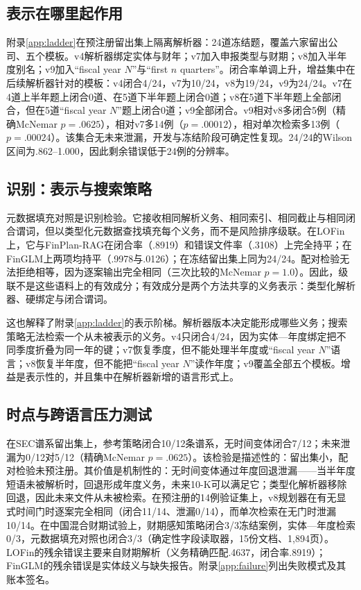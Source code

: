 \documentclass[10.5pt,a4paper]{ctexart}
\newcommand{\finplan}{FinPlan\mbox{-}RAG}
\begin{document}
\subsection{表示在哪里起作用}
附录\ref{app:ladder}在预注册留出集上隔离解析器：24道冻结题，覆盖六家留出公司、五个模板。v4解析器绑定实体与财年；v7加入申报类型与财期；v8加入半年度别名；v9加入“fiscal year $N$”与“first $n$ quarters”。闭合率单调上升，增益集中在后续解析器针对的模板：v4闭合4/24，v7为10/24，v8为19/24，v9为24/24。v7在4道上半年题上闭合0道、在5道下半年题上闭合0道；v8在5道下半年题上全部闭合，但在5道“fiscal year $N$”题上闭合0道；v9全部闭合。v9相对v8多闭合5例（精确McNemar $p=.0625$），相对v7多14例（$p=.00012$），相对单次检索多13例（$p=.00024$）。该集合无未来泄漏，开发与冻结阶段可确定性复现。24/24的Wilson区间为.862--1.000，因此剩余错误低于24例的分辨率。

\subsection{识别：表示与搜索策略}
\label{sec:identification}
元数据填充对照是识别检验。它接收相同解析义务、相同索引、相同截止与相同闭合谓词，但以类型化元数据查找填充每个义务，而不是风险排序级联。在LOFin上，它与\finplan{}在闭合率（.8919）和错误文件率（.3108）上完全持平；在FinGLM上两项均持平（.9978与.0126）；在冻结留出集上同为24/24。配对检验无法拒绝相等，因为逐案输出完全相同（三次比较的McNemar $p=1.0$）。因此，级联不是这些语料上的有效成分；有效成分是两个方法共享的义务表示：类型化解析器、硬绑定与闭合谓词。

这也解释了附录\ref{app:ladder}的表示阶梯。解析器版本决定能形成哪些义务；搜索策略无法检索一个从未被表示的义务。v4只闭合4/24，因为实体—年度绑定把不同季度折叠为同一年的键；v7恢复季度，但不能处理半年度或“fiscal year $N$”语言；v8恢复半年度，但不能把“fiscal year $N$”读作年度；v9覆盖全部五个模板。增益是表示性的，并且集中在解析器新增的语言形式上。

\subsection{时点与跨语言压力测试}
\label{sec:pointintime}
在SEC谱系留出集上，参考策略闭合10/12条谱系，无时间变体闭合7/12；未来泄漏为0/12对5/12（精确McNemar $p=.0625$）。该检验是描述性的：留出集小，配对检验未预注册。其价值是机制性的：无时间变体通过年度回退泄漏——当半年度短语未被解析时，回退形成年度义务，未来10-K可以满足它；类型化解析器移除回退，因此未来文件从未被检索。在预注册的14例验证集上，v8规划器在有无显式时间门时逐案完全相同（闭合11/14、泄漏0/14），而单次检索在无门时泄漏10/14。在中国混合财期试验上，财期感知策略闭合3/3冻结案例，实体—年度检索0/3，元数据填充对照也闭合3/3（确定性字段读取器，15份文档、1,894页）。LOFin的残余错误主要来自财期解析（义务精确匹配.4637，闭合率.8919）；FinGLM的残余错误是实体歧义与缺失报告。附录\ref{app:failure}列出失败模式及其账本签名。
\end{document}
